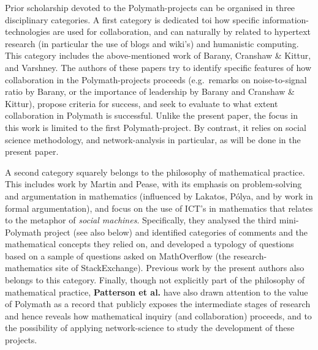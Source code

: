 \documentclass[article, floatfix, groupaddress, prb]{revtex4-1}
\begin{document}
    Prior scholarship devoted to the Polymath-projects can be organised in
three disciplinary categories. A first category is dedicated toi how
specific information-technologies are used for collaboration, and can
naturally by related to hypertext research (in particular the use of
blogs and wiki's) and humanistic computing. This category includes the
above-mentioned work of Barany, Cranshaw \& Kittur, and Varshney. The
authors of these papers try to identify specific features of how
collaboration in the Polymath-projects proceeds (e.g.~remarks on
noise-to-signal ratio by Barany, or the importance of leadership by
Barany and Cranshaw \& Kittur), propose criteria for success, and seek
to evaluate to what extent collaboration in Polymath is successful.
Unlike the present paper, the focus in this work is limited to the first
Polymath-project. By contrast, it relies on social science methodology,
and network-analysis in particular, as will be done in the present
paper.

A second category squarely belongs to the philosophy of mathematical
practice. This includes work by Martin and Pease, with its emphasis on
problem-solving and argumentation in mathematics (influenced by Lakatos,
Pólya, and by work in formal argumentation), and focus on the use of
ICT's in mathematics that relates to the metaphor of \emph{social
machines}. Specifically, they analysed the third mini-Polymath project
(see also below) and identified categories of comments and the
mathematical concepts they relied on, and developed a typology of
questions based on a sample of questions asked on MathOverflow (the
research-mathematics site of StackExchange). Previous work by the
present authors also belongs to this category. Finally, though not
explicitly part of the philosophy of mathematical practice,
\textbf{Patterson et al.} have also drawn attention to the value of
Polymath as a record that publicly exposes the intermediate stages of
research and hence reveals how mathematical inquiry (and collaboration)
proceeds, and to the possibility of applying network-science to study
the development of these projects.
\end{document}
